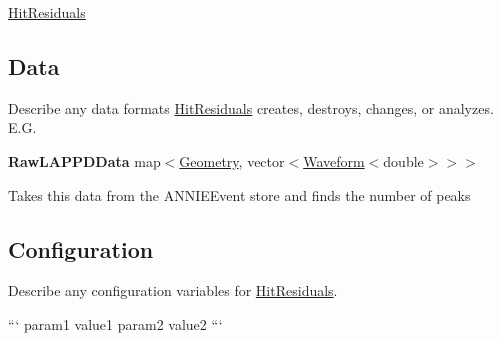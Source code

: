 \hyperlink{classHitResiduals}{Hit\-Residuals}

\subsection*{Data}

Describe any data formats \hyperlink{classHitResiduals}{Hit\-Residuals} creates, destroys, changes, or analyzes. E.\-G.

{\bfseries Raw\-L\-A\-P\-P\-D\-Data} {\ttfamily map$<$\hyperlink{classGeometry}{Geometry}, vector$<$\hyperlink{classWaveform}{Waveform}$<$double$>$$>$$>$}
\begin{DoxyItemize}
\item Takes this data from the {\ttfamily A\-N\-N\-I\-E\-Event} store and finds the number of peaks
\end{DoxyItemize}

\subsection*{Configuration}

Describe any configuration variables for \hyperlink{classHitResiduals}{Hit\-Residuals}.

``` param1 value1 param2 value2 ``` 